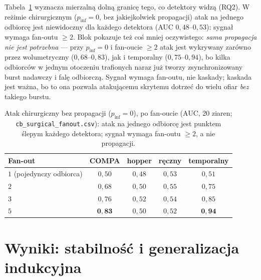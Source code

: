 Tabela~\ref{tab:k-fanout} wyznacza mierzalną dolną granicę tego, co
detektory widzą (RQ2). W reżimie chirurgicznym ($p_{\mathrm{inf}}=0$,
bez jakiejkolwiek propagacji) atak na jednego odbiorcę jest
niewidoczny dla każdego detektora (AUC $0{,}48$--$0{,}53$): sygnał
wymaga fan-outu $\ge2$. Blok pokazuje też coś mniej oczywistego:
\emph{sama propagacja nie jest potrzebna} --- przy
$p_{\mathrm{inf}}=0$ i fan-oucie $\ge2$ atak jest wykrywany zarówno
przez wolumetryczny ($0{,}68$--$0{,}83$), jak i temporalny
($0{,}75$--$0{,}94$), bo kilka odbiorców w jednym otoczeniu
trafionych naraz już tworzy zsynchronizowany burst nadawczy i falę
odbiorczą. Sygnał wymaga fan-outu, nie kaskady; kaskada jest ważna,
bo to ona pozwala atakującemu skrytemu dotrzeć do wielu ofiar
\emph{bez} takiego burstu.

\begin{table}[htbp]\centering
\begin{tabular}{lcccc}
\toprule
Fan-out & COMPA & hopper & ręczny & temporalny \\
\midrule
$1$ (pojedynczy odbiorca) & $0{,}50$ & $0{,}48$ & $0{,}53$ & $0{,}51$ \\
$2$ & $0{,}68$ & $0{,}50$ & $0{,}55$ & $0{,}75$ \\
$3$ & $0{,}76$ & $0{,}52$ & $0{,}54$ & $0{,}85$ \\
$5$ & $\mathbf{0{,}83}$ & $0{,}50$ & $0{,}52$ & $\mathbf{0{,}94}$ \\
\bottomrule
\end{tabular}
\caption{Atak chirurgiczny bez propagacji ($p_{\mathrm{inf}}=0$),
po fan-oucie (AUC, 20 ziaren; \texttt{cb\_surgical\_fanout.csv}):
atak na jednego odbiorcę jest punktem ślepym każdego detektora;
sygnał wymaga fan-outu $\ge2$, a nie propagacji.}
\label{tab:k-fanout}
\end{table}

\section{Wyniki: stabilność i generalizacja indukcyjna}
\label{sec:k-stabilnosc}


